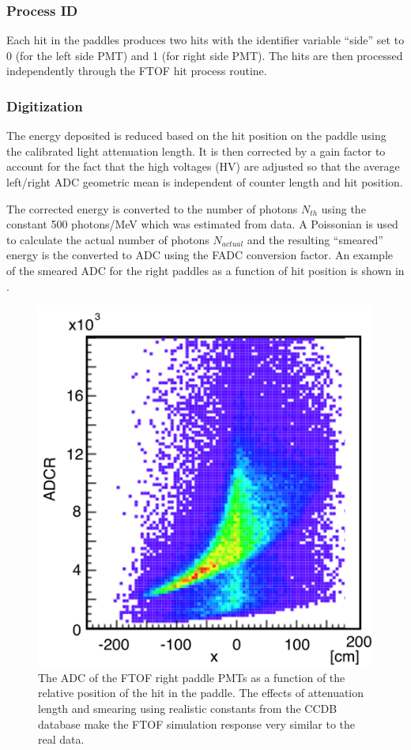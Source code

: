 \subsubsection{Process ID}

Each hit in the paddles produces two hits with the identifier variable ``side'' set to 0
(for the left side PMT) and 1 (for right side PMT).
The hits are then processed independently through the FTOF hit process routine.

\subsubsection{Digitization}

The energy deposited is reduced based on the hit position on the paddle using the calibrated light attenuation length.
It is then corrected by a gain factor to account for the fact that the high voltages (HV) are adjusted so that
the average left/right ADC geometric mean is independent of counter length and hit position.

The corrected energy is converted to the number of photons $N_{th}$ using the constant 500 photons/MeV
which was estimated from data.
A Poissonian is used to calculate the actual number of photons $N_{actual}$ and the resulting ``smeared'' energy
is the converted to ADC using the FADC conversion factor.
An example of the smeared ADC for the right paddles as a function of hit position is shown in .

\begin{figure}
	\centering
	\includegraphics[width=0.99\columnwidth,keepaspectratio]{img/ftofAtten.png}
	\caption{The ADC of the FTOF right paddle PMTs as a function of the relative position of the hit in the paddle.
             The effects of attenuation length and smearing using realistic constants from the CCDB database make
             the FTOF simulation response very similar to the real data.}
	\label{fig:ftofAtten}
\end{figure}

